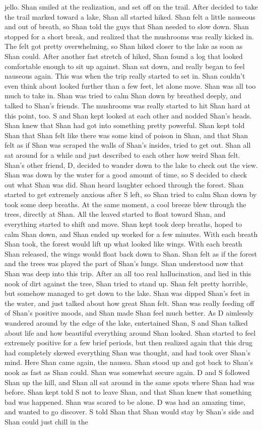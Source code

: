 \documentclass[12pt]{book}
\begin{document}
jello. Shan smiled at the realization, and set off on the trail. After decided to take the trail marked toward a lake, Shan all started hiked. Shan felt a little nauseous and out of breath, so Shan told the guys that Shan needed to slow down. Shan stopped for a short break, and realized that the mushrooms was really kicked in. The felt got pretty overwhelming, so Shan hiked closer to the lake as soon as Shan could. After another fast stretch of hiked, Shan found a log that looked comfortable enough to sit up against. Shan sat down, and really began to feel nauseous again. This was when the trip really started to set in. Shan couldn't even think about looked further than a few feet, let alone move. Shan was all too much to take in. Shan was tried to calm Shan down by breathed deeply, and talked to Shan's friends. The mushrooms was really started to hit Shan hard at this point, too. S and Shan kept looked at each other and nodded Shan's heads. Shan knew that Shan had got into something pretty powerful. Shan kept told Shan that Shan felt like there was some kind of poison in Shan, and that Shan felt as if Shan was scraped the walls of Shan's insides, tried to get out. Shan all sat around for a while and just described to each other how weird Shan felt. Shan's other friend, D, decided to wander down to the lake to check out the view. Shan was down by the water for a good amount of time, so S decided to check out what Shan was did. Shan heard laughter echoed through the forest. Shan started to get extremely anxious after S left, so Shan tried to calm Shan down by took some deep breaths. At the same moment, a cool breeze blew through the trees, directly at Shan. All the leaved started to float toward Shan, and everything started to shift and move. Shan kept took deep breaths, hoped to calm Shan down, and Shan ended up worked for a few minutes. With each breath Shan took, the forest would lift up what looked like wings. With each breath Shan released, the wings would float back down to Shan. Shan felt as if the forest and the trees was played the part of Shan's lungs. Shan understood now that Shan was deep into this trip. After an all too real hallucination, and lied in this nook of dirt against the tree, Shan tried to stand up. Shan felt pretty horrible, but somehow managed to get down to the lake. Shan was dipped Shan's feet in the water, and just talked about how great Shan felt. Shan was really feeding off of Shan's positive moods, and Shan made Shan feel much better. As D aimlessly wandered around by the edge of the lake, entertained Shan, S and Shan talked about life and how beautiful everything around Shan looked. Shan started to feel extremely positive for a few brief periods, but then realized again that this drug had completely skewed everything Shan was thought, and had took over Shan's mind. Here Shan came again, the nausea. Shan stood up and got back to Shan's nook as fast as Shan could. Shan was somewhat secure again. D and S followed Shan up the hill, and Shan all sat around in the same spots where Shan had was before. Shan kept told S not to leave Shan, and that Shan knew that something bad was happened. Shan was scared to be alone. D was had an amazing time, and wanted to go discover. S told Shan that Shan would stay by Shan's side and Shan could just chill in the 
\end{document}
